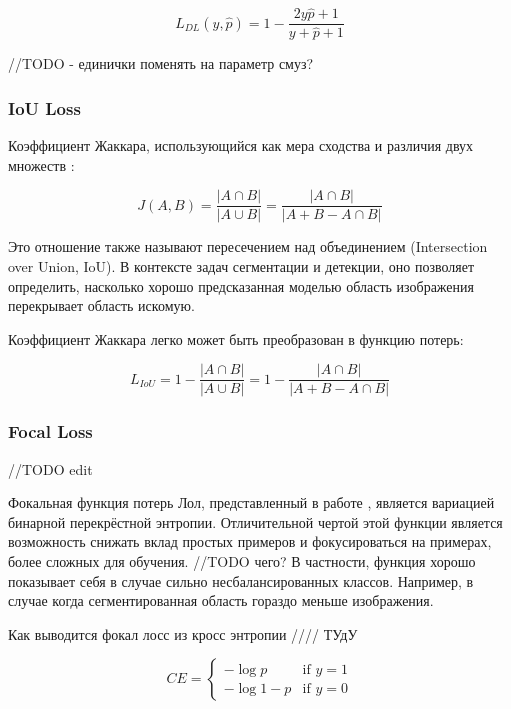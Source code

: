 \begin{equation}
    L_{DL}(y, \hat{p} ) = 1 - \frac{2y\hat{p} + 1}{y + \hat{p} + 1}
\end{equation}

//TODO - единички поменять на параметр смуз? 

\subsubsection{IoU Loss}

Коэффициент Жаккара, использующийся как мера 
сходства и различия двух множеств \cite{IoU-Loss}:

\begin{equation}
    J(A,B) = \frac{|A \cap B|}{|A \cup B|} = \frac{|A \cap B|}{|A + B - A \cap B|}
\end{equation}

Это отношение также называют пересечением над объединением 
(Intersection over Union, IoU). В контексте задач сегментации и детекции, 
оно позволяет определить, насколько 
хорошо предсказанная моделью область изображения перекрывает
область искомую.

Коэффициент Жаккара легко может быть преобразован в функцию потерь\cite{IoU-Loss-2}:

\begin{equation}
    L_{IoU} = 1- \frac{|A \cap B|}{|A \cup B|} = 1 - \frac{|A \cap B|}{|A + B - A \cap B|}
\end{equation}

\subsubsection{Focal Loss}

//TODO edit

Фокальная функция потерь Лол, представленный в работе \cite{Focal-Loss}, является вариацией бинарной перекрёстной энтропии.
Отличительной чертой этой функции является возможность снижать вклад простых примеров и фокусироваться на примерах, более сложных
для обучения. //TODO чего?
В частности, функция хорошо показывает себя в случае сильно несбалансированных классов.
Например, в случае когда сегментированная область гораздо меньше изображения.

Как выводится фокал лосс из кросс энтропии //// ТУдУ

\begin{equation}
    CE=\begin{cases}
        -\log{p} & \text{if }y=1\\
        -\log{1-p} & \text{if }y=0
     \end{cases}
\end{equation}

